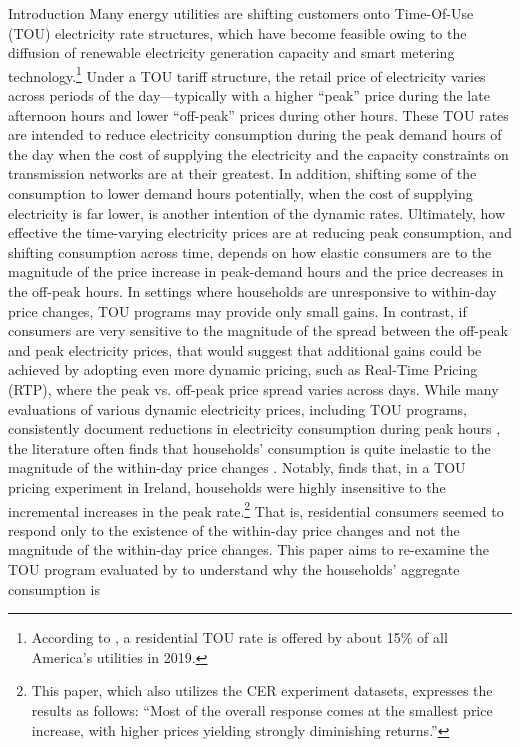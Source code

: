 Introduction
Many energy utilities are shifting customers onto Time-Of-Use (TOU) electricity rate structures, which have become feasible owing to the diffusion of renewable electricity generation capacity and smart metering technology.\footnote{According to \cite{A-Survey-of-Residential-TOU-Rates_FHS_2019}, a residential TOU rate is offered by about 15\% of all America's utilities in 2019.} Under a TOU tariff structure, the retail price of electricity varies across periods of the day---typically with a higher ``peak'' price during the late afternoon hours and lower ``off-peak'' prices during other hours. These TOU rates are intended to reduce electricity consumption during the peak demand hours of the day when the cost of supplying the electricity and the capacity constraints on transmission networks are at their greatest. In addition, shifting some of the consumption to lower demand hours potentially, when the cost of supplying electricity is far lower, is another intention of the dynamic rates. Ultimately, how effective the time-varying electricity prices are at reducing peak consumption, and shifting consumption across time, depends on how elastic consumers are to the magnitude of the price increase in peak-demand hours and the price decreases in the off-peak hours. In settings where households are unresponsive to within-day price changes, TOU programs may provide only small gains. In contrast, if consumers are very sensitive to the magnitude of the spread between the off-peak and peak electricity prices, that would suggest that additional gains could be achieved by adopting even more dynamic pricing, such as Real-Time Pricing (RTP), where the peak vs. off-peak price spread varies across days. While many evaluations of various dynamic electricity prices, including TOU programs, consistently document reductions in electricity consumption during peak hours \citep{Quantifying-Customer-Response-to-Dynamic-Pricing_Faruqui-and-George_2005, Dynamic-Pricing-of-Electricity-in-the-Mid-Atlantic-Region_Econometric-Results-from-the-Baltimore-Gas-and-Electric-Company-Experiment_Faruqui-et-al_2011, Dynamic-Pricing-of-Electricity-for-Residential-Customers_The-Evidence-from-Michigan_Faruqui-et-al_2013}, the literature often finds that households' consumption is quite inelastic to the magnitude of the within-day price changes \citep{Rethinking-Real-Time-Electricity-Pricing_Allcott_2011, Knowledge-is-Less-Power_Jessoe-and-Rapson_2014}. Notably, \cite{Peaking-Interest:How-Awareness-Drives-the-Effectiveness-of-Time-of-Use-Electricity-Pricing_Prest_2020} finds that, in a TOU pricing experiment in Ireland, households were highly insensitive to the incremental increases in the peak rate.\footnote{This paper, which also utilizes the CER experiment datasets, expresses the results as follows: ``Most of the overall response comes at the smallest price increase, with higher prices yielding strongly diminishing returns.''} That is, residential consumers seemed to respond only to the existence of the within-day price changes and not the magnitude of the within-day price changes. This paper aims to re-examine the TOU program evaluated by \cite{Peaking-Interest:How-Awareness-Drives-the-Effectiveness-of-Time-of-Use-Electricity-Pricing_Prest_2020} to understand why the households' aggregate consumption is 